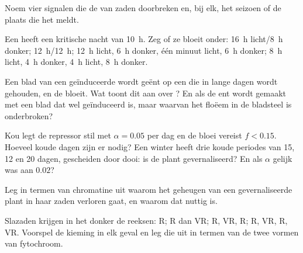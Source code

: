 \begin{exercise}[$\star$]\label{exo:b2:plant-flowering:4}
Noem vier signalen die de  van zaden doorbreken en, bij elk, het
seizoen of de plaats die het meldt.
\end{exercise}

\begin{exercise}[$\star\star$]\label{exo:b2:plant-flowering:5}
Een  heeft een kritische nacht van \qty{10}{h}. Zeg of ze
bloeit onder: \qty{16}{h} licht/\qty{8}{h} donker; \qty{12}{h}/\qty{12}{h};
\qty{12}{h} licht, \qty{6}{h} donker, één minuut licht, \qty{6}{h} donker;
\qty{8}{h} licht, \qty{4}{h} donker, \qty{4}{h} licht, \qty{8}{h} donker.
\end{exercise}

\begin{exercise}[$\star\star$]\label{exo:b2:plant-flowering:6}
Een blad van een geïnduceerde  wordt geënt op een
 die in lange dagen wordt gehouden, en de 
bloeit. Wat toont dit aan over ? En als de ent wordt gemaakt met
een blad dat wel geïnduceerd is, maar waarvan het floëem in de bladsteel is
onderbroken?
\end{exercise}

\begin{exercise}[$\star\star$]\label{exo:b2:plant-flowering:7}
Kou legt de repressor stil met $\alpha = 0.05$ per dag en de bloei vereist
$f < 0.15$. Hoeveel koude dagen zijn er nodig? Een winter heeft drie koude
periodes van 15, 12 en 20 dagen, gescheiden door dooi: is de plant
gevernaliseerd? En als $\alpha$ gelijk was aan $0.02$?
\end{exercise}

\begin{exercise}[$\star\star$]\label{exo:b2:plant-flowering:8}
Leg in termen van chromatine uit waarom het geheugen van een gevernaliseerde
plant in haar zaden verloren gaat, en waarom dat nuttig is.
\end{exercise}

\begin{exercise}[$\star\star$]\label{exo:b2:plant-flowering:9}
Slazaden krijgen in het donker de reeksen: R; R dan VR; R, VR, R; R, VR, R,
VR. Voorspel de kieming in elk geval en leg die uit in termen van de twee
vormen van fytochroom.
\end{exercise}

